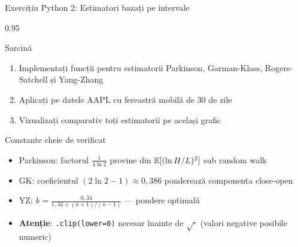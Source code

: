 \documentclass[9pt, aspectratio=169, t]{beamer}
\begin{document}
\begin{frame}[shrink=10]{Exercițiu Python 2: Estimatori bazați pe intervale}
\begin{cminipage}{0.95\textwidth}
    \begin{block}{Sarcină}
    \begin{enumerate}\setlength{\itemsep}{0pt}
        \item Implementați funcții pentru estimatorii Parkinson, Garman-Klass, Rogers-Satchell și Yang-Zhang
        \item Aplicați pe datele AAPL cu fereastră mobilă de 30 de zile
        \item Vizualizați comparativ toți estimatorii pe același grafic
    \end{enumerate}
    \end{block}

    \vspace{0.2cm}
    \begin{alertblock}{Constante cheie de verificat}
    \begin{itemize}\setlength{\itemsep}{0pt}
        \item Parkinson: factorul $\frac{1}{4\ln 2}$ provine din $\mathbb{E}[(\ln H/L)^2]$ sub random walk
        \item GK: coeficientul $(2\ln 2 - 1) \approx 0{,}386$ ponderează componenta close-open
        \item YZ: $k = \frac{0{,}34}{1{,}34 + (n+1)/(n-1)}$ --- pondere optimală
        \item \textbf{Atenție}: \texttt{.clip(lower=0)} necesar înainte de $\sqrt{\cdot}$ (valori negative posibile numeric)
    \end{itemize}
    \end{alertblock}

\end{cminipage}
\end{frame}
\end{document}
